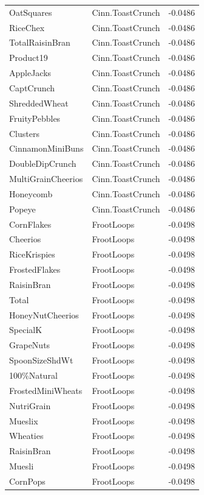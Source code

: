 \begin{table}[!htbp]
\begin{tabular}{lll}
\\
OatSquares & Cinn.ToastCrunch & -0.0486
\\
RiceChex & Cinn.ToastCrunch & -0.0486
\\
TotalRaisinBran & Cinn.ToastCrunch & -0.0486
\\
Product19 & Cinn.ToastCrunch & -0.0486
\\
AppleJacks & Cinn.ToastCrunch & -0.0486
\\
CaptCrunch & Cinn.ToastCrunch & -0.0486
\\
ShreddedWheat & Cinn.ToastCrunch & -0.0486
\\
FruityPebbles & Cinn.ToastCrunch & -0.0486
\\
Clusters & Cinn.ToastCrunch & -0.0486
\\
CinnamonMiniBuns & Cinn.ToastCrunch & -0.0486
\\
DoubleDipCrunch & Cinn.ToastCrunch & -0.0486
\\
MultiGrainCheerios & Cinn.ToastCrunch & -0.0486
\\
Honeycomb & Cinn.ToastCrunch & -0.0486
\\
Popeye & Cinn.ToastCrunch & -0.0486
\\
CornFlakes & FrootLoops & -0.0498
\\
Cheerios & FrootLoops & -0.0498
\\
RiceKrispies & FrootLoops & -0.0498
\\
FrostedFlakes & FrootLoops & -0.0498
\\
RaisinBran & FrootLoops & -0.0498
\\
Total & FrootLoops & -0.0498
\\
HoneyNutCheerios & FrootLoops & -0.0498
\\
SpecialK & FrootLoops & -0.0498
\\
GrapeNuts & FrootLoops & -0.0498
\\
SpoonSizeShdWt & FrootLoops & -0.0498
\\
100\%Natural & FrootLoops & -0.0498
\\
FrostedMiniWheats & FrootLoops & -0.0498
\\
NutriGrain & FrootLoops & -0.0498
\\
Mueslix & FrootLoops & -0.0498
\\
Wheaties & FrootLoops & -0.0498
\\
RaisinBran & FrootLoops & -0.0498
\\
Muesli & FrootLoops & -0.0498
\\
CornPops & FrootLoops & -0.0498
\\

\end{tabular}
\end{table}
